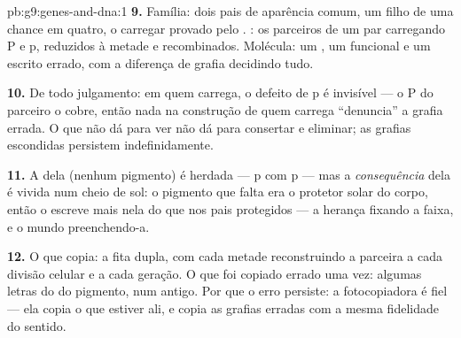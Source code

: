 \begin{solution}{pb:g9:genes-and-dna:1}
\textbf{9.} Família: dois pais de aparência comum, um filho
de uma chance em quatro, o carregar provado pelo .
: os parceiros de um par carregando P e p,
reduzidos à metade e recombinados. Molécula: um , um
 funcional e um  escrito errado, com a diferença de
grafia decidindo tudo.

\textbf{10.} De todo julgamento: em quem carrega, o defeito
de p é invisível --- o P do parceiro o cobre, então nada na
construção de quem carrega ``denuncia'' a grafia errada. O
que não dá para ver não dá para consertar e eliminar; as
grafias escondidas persistem indefinidamente.

\textbf{11.} A  dela (nenhum pigmento) é
herdada --- p com p --- mas a \emph{consequência} dela é
vivida num  cheio de sol: o pigmento que falta era o
protetor solar do corpo, então o  escreve mais nela
do que nos pais protegidos --- a herança fixando a faixa, e o
mundo preenchendo-a.

\textbf{12.} O que copia: a fita dupla, com cada metade
reconstruindo a parceira a cada divisão celular e a cada
geração. O que foi copiado errado uma vez: algumas letras do
 do pigmento, num  antigo. Por que o erro persiste:
a fotocopiadora é fiel --- ela copia o que estiver ali, e
copia as grafias erradas com a mesma fidelidade do sentido.
\end{solution}
